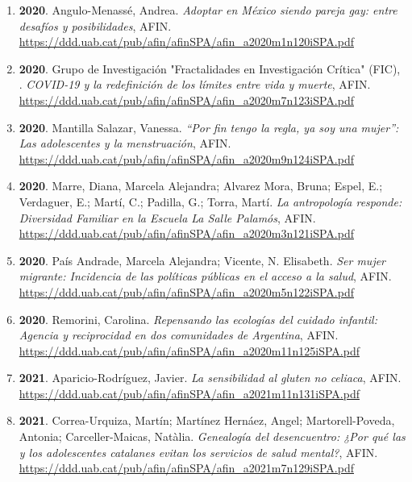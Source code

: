 \begin{enumerate}
\item {\bf 2020}. Angulo-Menassé, Andrea. {\it Adoptar en México siendo pareja gay: entre desafíos y posibilidades}, AFIN. \\ \url{ https://ddd.uab.cat/pub/afin/afinSPA/afin\_a2020m1n120iSPA.pdf }\filbreak
\item {\bf 2020}. Grupo de Investigación "Fractalidades en Investigación Crítica" (FIC), . {\it COVID-19 y la redefinición de los límites entre vida y muerte}, AFIN. \\ \url{ https://ddd.uab.cat/pub/afin/afinSPA/afin\_a2020m7n123iSPA.pdf }\filbreak
\item {\bf 2020}. Mantilla Salazar, Vanessa. {\it “Por fin tengo la regla, ya soy una mujer”: Las adolescentes y la menstruación}, AFIN. \\ \url{ https://ddd.uab.cat/pub/afin/afinSPA/afin\_a2020m9n124iSPA.pdf }\filbreak
\item {\bf 2020}. Marre, Diana, Marcela Alejandra; Alvarez Mora, Bruna; Espel, E.; Verdaguer, E.; Martí, C.; Padilla, G.; Torra, Martí. {\it La antropología responde: Diversidad Familiar en la Escuela La Salle Palamós}, AFIN. \\ \url{ https://ddd.uab.cat/pub/afin/afinSPA/afin\_a2020m3n121iSPA.pdf }\filbreak
\item {\bf 2020}. País Andrade, Marcela Alejandra; Vicente, N. Elisabeth. {\it Ser mujer migrante: Incidencia de las políticas públicas en el acceso a la salud}, AFIN. \\ \url{ https://ddd.uab.cat/pub/afin/afinSPA/afin\_a2020m5n122iSPA.pdf }\filbreak
\item {\bf 2020}. Remorini, Carolina. {\it Repensando las ecologías del cuidado infantil: Agencia y reciprocidad en dos comunidades de Argentina}, AFIN. \\ \url{ https://ddd.uab.cat/pub/afin/afinSPA/afin\_a2020m11n125iSPA.pdf }\filbreak
\item {\bf 2021}. Aparicio-Rodríguez, Javier. {\it La sensibilidad al gluten no celiaca}, AFIN. \\ \url{ https://ddd.uab.cat/pub/afin/afinSPA/afin\_a2021m11n131iSPA.pdf }\filbreak
\item {\bf 2021}. Correa-Urquiza, Martín; Martínez Hernáez, Angel; Martorell-Poveda, Antonia; Carceller-Maicas, Natàlia. {\it Genealogía del desencuentro: ¿Por qué las y los adolescentes catalanes evitan los servicios de salud mental?}, AFIN. \\ \url{ https://ddd.uab.cat/pub/afin/afinSPA/afin\_a2021m7n129iSPA.pdf }\filbreak

\end{enumerate}
